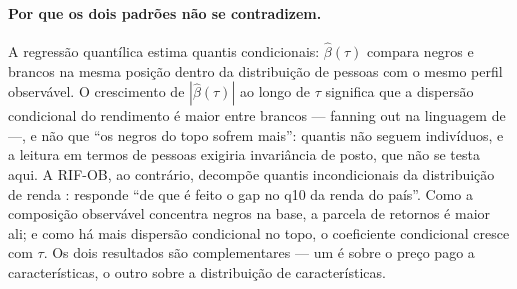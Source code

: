 \documentclass[11pt, a4paper, oneside]{article}
\begin{document}
\paragraph{Por que os dois padrões não se contradizem.} A regressão quantílica
estima quantis {condicionais}: $\hat\beta(\tau)$ compara negros e brancos na
mesma posição {dentro} da distribuição de pessoas com o mesmo perfil observável.
O crescimento de $|\hat\beta(\tau)|$ ao longo de $\tau$ significa que a dispersão
condicional do rendimento é maior entre brancos --- {fanning out} na linguagem de
 ---, e não que ``os negros do topo sofrem mais'': quantis não
seguem indivíduos, e a leitura em termos de pessoas exigiria invariância de posto, que
não se testa aqui. A RIF-OB, ao contrário, decompõe quantis {incondicionais} da
distribuição de renda \cite{firpo2018}: responde ``de que é feito o gap no q10 da renda
do país''. Como a composição observável concentra negros na base, a parcela de retornos
é maior ali; e como há mais dispersão condicional no topo, o coeficiente condicional
cresce com $\tau$. Os dois resultados são complementares --- um é sobre o {preço}
pago a características, o outro sobre a {distribuição} de características.
\end{document}
